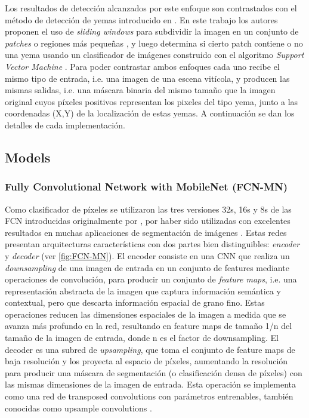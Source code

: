 \documentclass[a4paper,authoryear,review]{elsarticle}
\begin{document}
%
Los resultados de detección alcanzados por este enfoque son contrastados con el método de detección de yemas introducido en \citet{perez2017image}. En este trabajo los autores proponen el uso de \emph{sliding windows} para subdividir la imagen en un conjunto de \emph{patches} o regiones más pequeñas \citep{perez2017image}, y luego determina si cierto patch contiene o no una yema usando un clasificador de imágenes construido con el algoritmo \emph{Support Vector Machine} \citep{vapnik2013nature}. Para poder contrastar ambos enfoques cada uno recibe el mismo tipo de entrada, i.e. una imagen de una escena vitícola, y producen las mismas salidas, i.e. una máscara binaria del mismo tamaño que la imagen original cuyos píxeles positivos representan los pixeles del tipo yema, junto a las coordenadas (X,Y) de la localización de estas yemas. A continuación se dan los detalles de cada implementación.

\subsection{Models}
\subsubsection{Fully Convolutional Network with MobileNet (FCN-MN)} 
\label{sec:fcn}

Como clasificador de píxeles se utilizaron las tres versiones 32s, 16s y 8s de las FCN  introducidas originalmente por \citet{long2015fully}, por haber sido utilizadas con excelentes resultados en muchas aplicaciones de segmentación de imágenes \cite{litjens2017survey, garcia2018survey, kaymak2019brief}. Estas redes presentan arquitecturas características con dos partes bien distinguibles: \emph{encoder} y \emph{decoder} (ver \ref{fig:FCN-MN}). 
%
El encoder consiste en una CNN que realiza un \emph{downsampling} de una imagen de entrada en un conjunto de features mediante operaciones de convolución, para producir un conjunto de \emph{feature maps}, i.e. una representación abstracta de la imagen que captura información semántica y contextual, pero que descarta información espacial de grano fino. Estas operaciones reducen las dimensiones espaciales de la imagen a medida que se avanza más profundo en la red, resultando en feature maps de tamaño 1/n del tamaño de la imagen de entrada, donde n es el factor de downsampling. El decoder es una subred de \emph{upsampling}, que toma el conjunto de feature maps de baja resolución y los proyecta al espacio de píxeles, aumentando la resolución para producir una máscara de segmentación (o clasificación densa de píxeles) con las mismas dimensiones de la imagen de entrada. Esta operación se implementa como una red de transposed convolutions con parámetros entrenables, también conocidas como upsample convolutions \citet{shelhamer2017fully}. 
\end{document}
